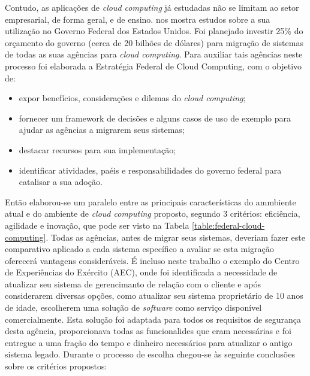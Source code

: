 Contudo, as aplicações de \emph{cloud computing} já estudadas não se limitam
ao setor empresarial, de forma geral, e de ensino. 
nos mostra estudos sobre a sua utilização no Governo Federal dos Estados Unidos.
Foi planejado investir 25\% do orçamento do governo (cerca de 20 bilhões de dólares)
para migração de sistemas de todas as suas agências para \emph{cloud computing}.
Para auxiliar tais agências neste processo foi elaborada a Estratégia Federal
de Cloud Computing, com o objetivo de:

\begin{itemize}
    \item
        expor benefícios, considerações e dilemas do \emph{cloud computing};
    \item
        fornecer um framework de decisões e alguns casos de uso de exemplo
        para ajudar as agências a migrarem seus sistemas;
    \item
        destacar recursos para sua implementação;
    \item
        identificar atividades, paéis e responsabilidades do governo federal
        para catalisar a sua adoção.
\end{itemize}

Então elaborou-se um paralelo entre as principais características do ammbiente atual
e do ambiente de \emph{cloud computing} proposto, segundo 3 critérios: eficiência,
agilidade e inovação, que pode ser visto na Tabela \ref{table:federal-cloud-computing}.
Todas as agências, antes de migrar seus sistemas, deveriam fazer este comparativo
aplicado a cada sistema específico a avaliar se esta migração oferecerá vantagens consideráveis.
É incluso neste trabalho o exemplo do Centro de Experiências do Exército (AEC), onde foi identificada
a necessidade de atualizar seu sistema de gerencimanto de relação com o cliente e após
considerarem diversas opções, como atualizar seu sistema proprietário de 10 anos de idade,
escolherem uma solução de \emph{software} como serviço disponível comercialmente. Esta
solução foi adaptada para todos os requisitos de segurança desta agência, proporcionava
todas as funcionalides que eram necessárias e foi entregue a uma fração do tempo
e dinheiro necessários para atualizar o antigo sistema legado. Durante o processo de escolha
chegou-se às seguinte conclusões sobre os critérios propostos:


